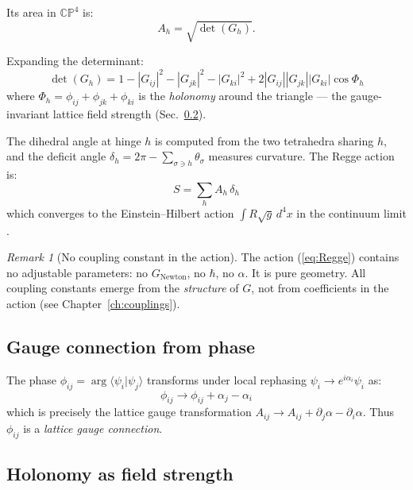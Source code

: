 \documentclass[12pt]{article}
\theoremstyle{remark}
\newtheorem{remark}[theorem]{Remark}
\theoremstyle{definition}
\begin{document}
Its area in $\mathbb{CP}^4$ is:
\begin{equation}
A_h = \sqrt{\det(G_h)}.
\end{equation}

Expanding the determinant:
\begin{equation}
\det(G_h) = 1 - |G_{ij}|^2 - |G_{jk}|^2 - |G_{ki}|^2 + 2|G_{ij}||G_{jk}||G_{ki}|\cos\Phi_h
\label{eq:detGh}
\end{equation}
where $\Phi_h = \phi_{ij} + \phi_{jk} + \phi_{ki}$ is the \emph{holonomy} around the triangle --- the gauge-invariant lattice field strength (Sec.~\ref{sec:holonomy}).

The dihedral angle at hinge $h$ is computed from the two tetrahedra sharing $h$, and the deficit angle $\delta_h = 2\pi - \sum_{\sigma \ni h} \theta_\sigma$ measures curvature. The Regge action is:
\begin{equation}
\boxed{S = \sum_h A_h\,\delta_h}
\label{eq:Regge}
\end{equation}
which converges to the Einstein--Hilbert action $\int R\sqrt{g}\,d^4x$ in the continuum limit \cite{Regge}.

\begin{remark}[No coupling constant in the action]
The action (\ref{eq:Regge}) contains no adjustable parameters: no $G_\text{Newton}$, no $\hbar$, no $\alpha$. It is pure geometry. All coupling constants emerge from the \emph{structure} of $G$, not from coefficients in the action (see Chapter~\ref{ch:couplings}).
\end{remark}

\subsection{Gauge connection from phase}
\label{sec:gauge_connection}

The phase $\phi_{ij} = \arg\langle\psi_i|\psi_j\rangle$ transforms under local rephasing $\psi_i \to e^{i\alpha_i}\psi_i$ as:
\begin{equation}
\phi_{ij} \to \phi_{ij} + \alpha_j - \alpha_i
\end{equation}
which is precisely the lattice gauge transformation $A_{ij} \to A_{ij} + \partial_j\alpha - \partial_i\alpha$. Thus $\phi_{ij}$ is a \emph{lattice gauge connection}.

\subsection{Holonomy as field strength}
\label{sec:holonomy}
\end{document}
